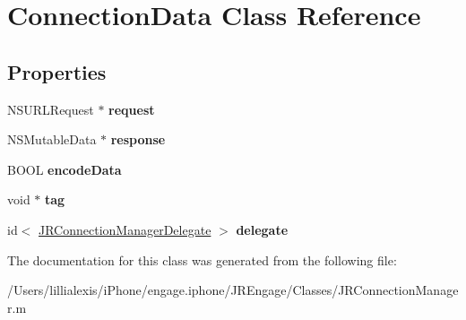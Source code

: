 \hypertarget{interface_connection_data}{
\section{ConnectionData Class Reference}
\label{interface_connection_data}
}
\subsection*{Properties}
\begin{DoxyCompactItemize}
\item 
\hypertarget{interface_connection_data_ab554cb599de68e3102c6ba2aa3ec9858}{
NSURLRequest $\ast$ {\bfseries request}}
\label{interface_connection_data_ab554cb599de68e3102c6ba2aa3ec9858}

\item 
\hypertarget{interface_connection_data_ab2f0cbe1871ee83bd490f265713c5589}{
NSMutableData $\ast$ {\bfseries response}}
\label{interface_connection_data_ab2f0cbe1871ee83bd490f265713c5589}

\item 
\hypertarget{interface_connection_data_a4c9508419525b1ebb4847b414d50a046}{
BOOL {\bfseries encodeData}}
\label{interface_connection_data_a4c9508419525b1ebb4847b414d50a046}

\item 
\hypertarget{interface_connection_data_a18b87d0456702e2e43bf8278667ccc32}{
void $\ast$ {\bfseries tag}}
\label{interface_connection_data_a18b87d0456702e2e43bf8278667ccc32}

\item 
\hypertarget{interface_connection_data_a8fe41ecfe167fc37535f0b067a53e988}{
id$<$ \hyperlink{protocol_j_r_connection_manager_delegate-p}{JRConnectionManagerDelegate} $>$ {\bfseries delegate}}
\label{interface_connection_data_a8fe41ecfe167fc37535f0b067a53e988}

\end{DoxyCompactItemize}


The documentation for this class was generated from the following file:\begin{DoxyCompactItemize}
\item 
/Users/lillialexis/iPhone/engage.iphone/JREngage/Classes/JRConnectionManager.m\end{DoxyCompactItemize}

